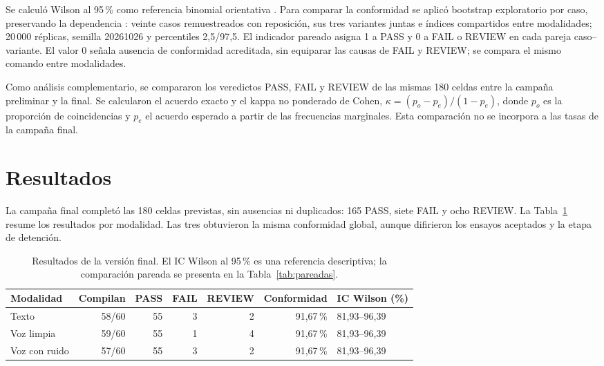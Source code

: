 \documentclass[a4paper,fleqn]{cas-dc}
\newcommand{\TituloResultados}{Resultados}
\newcommand{\TituloResultados}{Results}
\begin{document}
Se calculó Wilson al 95\,\% como referencia binomial orientativa \citep{nistWilson}. Para comparar la conformidad se aplicó bootstrap exploratorio por caso, preservando la dependencia \citep{field2007bootstrapcluster}: veinte casos remuestreados con reposición, sus tres variantes juntas e índices compartidos entre modalidades; 20\,000 réplicas, semilla 20261026 y percentiles 2,5/97,5. El indicador pareado asigna 1 a PASS y 0 a FAIL o REVIEW en cada pareja caso--variante. El valor 0 señala ausencia de conformidad acreditada, sin equiparar las causas de FAIL y REVIEW; se compara el mismo comando entre modalidades.

Como análisis complementario, se compararon los veredictos PASS, FAIL y REVIEW de las mismas 180 celdas entre la campaña preliminar y la final. Se calcularon el acuerdo exacto y el kappa no ponderado de Cohen, $\kappa=(p_o-p_e)/(1-p_e)$, donde $p_o$ es la proporción de coincidencias y $p_e$ el acuerdo esperado a partir de las frecuencias marginales. Esta comparación no se incorpora a las tasas de la campaña final.

\ifdefined\FloatBarrier\FloatBarrier\fi


\section{\TituloResultados}
\label{sec:resultados}
La campaña final completó las 180 celdas previstas, sin ausencias ni duplicados: 165 PASS, siete FAIL y ocho REVIEW. La Tabla~\ref{tab:resultados_modalidad} resume los resultados por modalidad. Las tres obtuvieron la misma conformidad global, aunque difirieron los ensayos aceptados y la etapa de detención.
\begin{table}[t]
\caption{Resultados de la versión final. El IC Wilson al 95\,\% es una referencia descriptiva; la comparación pareada se presenta en la Tabla~\ref{tab:pareadas}.}
\label{tab:resultados_modalidad}
\small
\begin{tabularx}{\textwidth}{@{}X r r r r r l@{}}
\toprule Modalidad & Compilan & PASS & FAIL & REVIEW & Conformidad & IC Wilson (\%)\\ \midrule
Texto & 58/60 & 55 & 3 & 2 & 91,67\,\% & 81,93--96,39\\
Voz limpia & 59/60 & 55 & 1 & 4 & 91,67\,\% & 81,93--96,39\\
Voz con ruido & 57/60 & 55 & 3 & 2 & 91,67\,\% & 81,93--96,39\\
\bottomrule
\end{tabularx}
\end{table}
\end{document}
